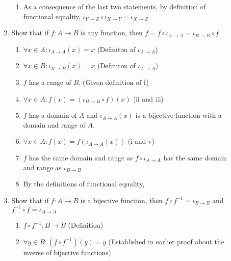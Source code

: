 \documentclass{article}
\begin{document}
\begin{enumerate}
\begin{enumerate}
\begin{enumerate}
                        \item As a consequence of the last two statements, by
                            definition of functional equality, ${\iota}_{Y
                            \rightarrow Z} \circ {\iota}_{X \rightarrow Y} =
                            {\iota}_{X \rightarrow Z}$
                    \end{enumerate}
                \item Show that if $f : A \rightarrow B$ is any function, then $f = f \circ {\iota}_{A \rightarrow A} = {\iota}_{B \rightarrow B} \circ f$
                    \begin{enumerate}
                        \item $\forall x \in A: {\iota}_{A \rightarrow A}(x) = x$ (Definiton of ${\iota}_{A \rightarrow A}$)
                        \item $\forall x \in B: {\iota}_{B \rightarrow B}(x) = x$ (Definiton of ${\iota}_{A \rightarrow A}$)
                        \item $f$ has a range of $B$. (Given definition of f)
                        \item $\forall x \in A: f(x) = ({\iota}_{B \rightarrow B} \circ f)(x)$ (ii and iii)
                        \item $f$ has a domain of $A$ and ${\iota}_{A \rightarrow A}(x)$ is a bijective function with a domain and range of $A$.
                        \item $\forall x \in A: f(x) = f({\iota}_{A \rightarrow A}(x))$ (i and v)
                        \item $f$ has the same domain and range as $f \circ
                            {\iota}_{A \rightarrow A}$ has the same domain and
                            range as ${\iota}_{B \rightarrow B}$
                        \item By the definitions of functional equality, 
                    \end{enumerate}
                \item Show that if $f : A \rightarrow B$ is a bijective
                    function, then $f \circ f^{-1} = {\iota}_{B \rightarrow
                    B}$ and $f^{-1} \circ f = {\iota}_{A \rightarrow A}$
                    \begin{enumerate}
                        \item $f \circ f^{-1} : B \rightarrow B$ (Definition)
                        \item $\forall y \in B: (f \circ f^{-1})(y) = y$ (Established in earlier proof about the inverse of bijective functions)

\end{enumerate}
\end{enumerate}
\end{enumerate}
\end{document}
